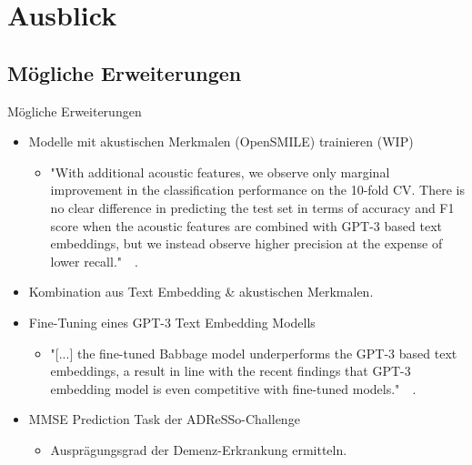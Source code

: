 \documentclass{sdqbeamer}
\begin{document}
\section{Ausblick}
\subsection{Mögliche Erweiterungen}
\begin{frame}{Mögliche Erweiterungen}
	\begin{itemize}
		\item Modelle mit akustischen Merkmalen (OpenSMILE) trainieren (WIP)
		\begin{itemize}
			\item "With additional acoustic features, we observe only marginal improvement in the classification performance on the 10-fold CV. There is no clear difference in predicting the test set in terms of accuracy and F1 score when the acoustic features are combined with GPT-3 based text embeddings, but we instead observe higher precision at the expense of lower recall."\ \textendash \ \cite{10.1371/journal.pdig.0000168}.
		\end{itemize}
		\item Kombination aus Text Embedding \& akustischen Merkmalen.
		\item Fine-Tuning eines GPT-3 Text Embedding Modells
		\begin{itemize}
			\item "[...] the fine-tuned Babbage model underperforms the GPT-3 based text embeddings, a result in line with the recent findings that GPT-3 embedding model is even competitive with fine-tuned models."\ \textendash \ \cite{10.1371/journal.pdig.0000168}.
		\end{itemize}
		\item MMSE Prediction Task der ADReSSo-Challenge
		\begin{itemize}
			\item Ausprägungsgrad der Demenz-Erkrankung ermitteln.
		\end{itemize}
	\end{itemize}
\end{frame}
\end{document}
